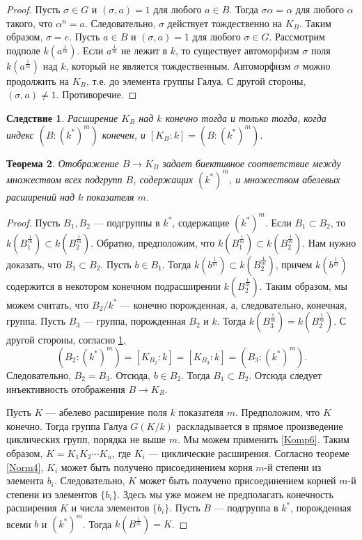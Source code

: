 \documentclass[12pt, titlepage, oneside]{amsbook}
\newtheorem{theorem}{Теорема}[chapter]
\newtheorem{corollary}[theorem]{Следствие}
\theoremstyle{definition}
\theoremstyle{remark}
\begin{document}
\begin{proof}
Пусть $\sigma\in G$ и $(\sigma,a)=1$ для любого $a\in B$. Тогда $\sigma\alpha=\alpha$ для любого $\alpha$ такого, что $\alpha^n=a$. Следовательно, $\sigma$ действует тождественно на $K_B$. Таким образом, $\sigma=e$. Пусть $a\in B$ и $(\sigma,a)=1$ для любого $\sigma\in G$. Рассмотрим подполе $k(a^{\frac{1}{m}})$. Если $a^{\frac{1}{m}}$ не лежит в $k$, то существует автоморфизм $\sigma$ поля $k(a^{\frac{1}{m}})$ над $k$, который не является тождественным. Автоморфизм $\sigma$ можно продолжить на $K_B$, т.е. до элемента группы Галуа. С другой стороны, $(\sigma,a)\neq 1$. Противоречие.
\end{proof}

\begin{corollary}
\label{Kum2}
Расширение $K_B$ над $k$ конечно тогда и только тогда, когда индекс $(B:(k^*)^m)$ конечен, и $[K_B:k]=(B:(k^*)^m)$.
\end{corollary}

\begin{theorem}
\label{Kum3}
Отображение $B\rightarrow K_B$ задает биективное соответствие между множеством всех подгрупп $B$, содержащих $(k^*)^m$, и множеством абелевых расширений над $k$ показателя $m$.
\end{theorem}

\begin{proof}
Пусть $B_1,B_2$ --- подгруппы в $k^*$, содержащие $(k^*)^m$. Если $B_1\subset B_2$, то $k(B_1^{\frac{1}{m}})\subset k(B_2^{\frac{1}{m}})$. Обратно, предположим, что $k(B_1^{\frac{1}{m}})\subset k(B_2^{\frac{1}{m}})$. Нам нужно доказать, что $B_1\subset B_2$. Пусть $b\in B_1$. Тогда $k(b^{\frac{1}{m}})\subset k(B_2^{\frac{1}{m}})$, причем $k(b^{\frac{1}{m}})$ содержится в некотором конечном подрасширении $k(B_2^{\frac{1}{m}})$. Таким образом, мы можем считать, что $B_2/k^*$ --- конечно порожденная, а, следовательно, конечная, группа. Пусть $B_3$ --- группа, порожденная $B_2$ и $k$. Тогда $k(B_3^{\frac{1}{m}})=k(B_2^{\frac{1}{m}})$. С другой стороны, согласно \ref{Kum2}, $$(B_2:(k^*)^m)=[K_{B_2}:k]=[K_{B_3}:k]=(B_3:(k^*)^m).$$ Следовательно, $B_2=B_3$. Отсюда, $b\in B_2$. Тогда $B_1\subset B_2$. Отсюда следует инъективность отображения $B\rightarrow K_B$.

Пусть $K$ --- абелево расширение поля $k$ показателя $m$. Предположим, что $K$ конечно. Тогда группа Галуа $G(K/k)$ раскладывается в прямое произведение циклических групп, порядка не выше $m$. Мы можем применить \ref{Komp6}. Таким образом, $K=K_1K_2\cdots K_n$, где $K_i$ --- циклические расширения. Согласно теореме \ref{Norm4}, $K_i$ может быть получено присоединением корня $m$-й степени из элемента $b_i$. Следовательно, $K$ может быть получено присоединением корней $m$-й степени из элементов $\{b_i\}$. Здесь мы уже можем не предполагать конечность расширения $K$ и числа элементов $\{b_i\}$. Пусть $B$ --- подгруппа в $k^*$, порожденная всеми $b$ и $(k^*)^m$. Тогда $k(B^{\frac{1}{m}})=K$.
\end{proof}
\end{document}

